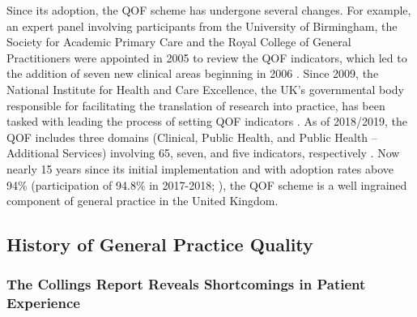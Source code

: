 \documentclass[12pt]{article}
\begin{document}
Since its adoption, the QOF scheme has undergone several changes. For example, an expert panel involving participants from the University of Birmingham, the Society for Academic Primary Care and the Royal College of General Practitioners were appointed in 2005 to review the QOF indicators, which led to the addition of seven new clinical areas beginning in 2006 \citep{lesterQualityOutcomesFramework2006}. Since 2009, the National Institute for Health and Care Excellence, the UK's governmental body responsible for facilitating the translation of research into practice, has been tasked with leading the process of setting QOF indicators \citep{sutcliffeNICEQualityOutcomes2012a}. As of 2018/2019, the QOF includes three domains (Clinical, Public Health, and Public Health -- Additional Services) involving 65, seven, and five indicators, respectively \citep{QOF201819}. Now nearly 15 years since its initial implementation and with adoption rates above 94\% (participation of 94.8\% in 2017-2018; \citep{QualityOutcomesFramework}), the QOF scheme is a well ingrained component of general practice in the United Kingdom.

\subsection{History of General Practice Quality}

\subsubsection{The Collings Report Reveals Shortcomings in Patient Experience}
\end{document}
